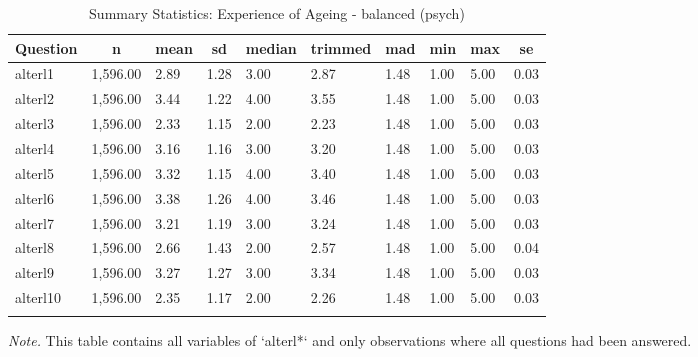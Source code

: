 \documentclass[
  doc]{apa6}
\begin{document}
\begin{table}[tbp]

\begin{center}
\begin{threeparttable}

\caption{\label{tab:tabsumstatalterpsychbal}Summary Statistics: Experience of Ageing - balanced (psych)}

\begin{tabular}{llllllllll}
\toprule
Question & \multicolumn{1}{c}{n} & \multicolumn{1}{c}{mean} & \multicolumn{1}{c}{sd} & \multicolumn{1}{c}{median} & \multicolumn{1}{c}{trimmed} & \multicolumn{1}{c}{mad} & \multicolumn{1}{c}{min} & \multicolumn{1}{c}{max} & \multicolumn{1}{c}{se}\\
\midrule
alterl1 & 1,596.00 & 2.89 & 1.28 & 3.00 & 2.87 & 1.48 & 1.00 & 5.00 & 0.03\\
alterl2 & 1,596.00 & 3.44 & 1.22 & 4.00 & 3.55 & 1.48 & 1.00 & 5.00 & 0.03\\
alterl3 & 1,596.00 & 2.33 & 1.15 & 2.00 & 2.23 & 1.48 & 1.00 & 5.00 & 0.03\\
alterl4 & 1,596.00 & 3.16 & 1.16 & 3.00 & 3.20 & 1.48 & 1.00 & 5.00 & 0.03\\
alterl5 & 1,596.00 & 3.32 & 1.15 & 4.00 & 3.40 & 1.48 & 1.00 & 5.00 & 0.03\\
alterl6 & 1,596.00 & 3.38 & 1.26 & 4.00 & 3.46 & 1.48 & 1.00 & 5.00 & 0.03\\
alterl7 & 1,596.00 & 3.21 & 1.19 & 3.00 & 3.24 & 1.48 & 1.00 & 5.00 & 0.03\\
alterl8 & 1,596.00 & 2.66 & 1.43 & 2.00 & 2.57 & 1.48 & 1.00 & 5.00 & 0.04\\
alterl9 & 1,596.00 & 3.27 & 1.27 & 3.00 & 3.34 & 1.48 & 1.00 & 5.00 & 0.03\\
alterl10 & 1,596.00 & 2.35 & 1.17 & 2.00 & 2.26 & 1.48 & 1.00 & 5.00 & 0.03\\
\bottomrule
\addlinespace
\end{tabular}

\begin{tablenotes}[para]
\normalsize{\textit{Note.} This table contains all variables of `alterl*` and only observations where all questions had been answered.}
\end{tablenotes}

\end{threeparttable}
\end{center}

\end{table}
\end{document}
